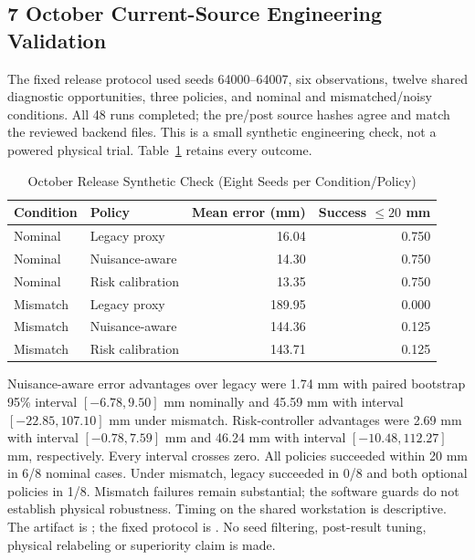 \subsection{7 October Current-Source Engineering Validation}
The fixed release protocol used seeds 64000--64007, six observations, twelve
shared diagnostic opportunities, three policies, and nominal and mismatched/noisy
conditions. All 48 runs completed; the pre/post source hashes agree and match the
reviewed backend files. This is a small synthetic engineering check, not a powered
physical trial. Table~\ref{tab:october-release} retains every outcome.
\begin{table}[t]
\caption{October Release Synthetic Check (Eight Seeds per Condition/Policy)}
\label{tab:october-release}
\centering\scriptsize
\begin{tabular}{@{}llrr@{}}\toprule
Condition & Policy & Mean error (mm) & Success $\leq20$ mm \\
\midrule
Nominal & Legacy proxy & 16.04 & 0.750 \\
Nominal & Nuisance-aware & 14.30 & 0.750 \\
Nominal & Risk calibration & 13.35 & 0.750 \\
Mismatch & Legacy proxy & 189.95 & 0.000 \\
Mismatch & Nuisance-aware & 144.36 & 0.125 \\
Mismatch & Risk calibration & 143.71 & 0.125 \\
\bottomrule\end{tabular}
\end{table}
Nuisance-aware error advantages over legacy were 1.74 mm with paired bootstrap
95\% interval $[-6.78,9.50]$ mm nominally and 45.59 mm with interval
$[-22.85,107.10]$ mm under mismatch. Risk-controller advantages were 2.69 mm
with interval $[-0.78,7.59]$ mm and 46.24 mm with interval $[-10.48,112.27]$ mm,
respectively. Every interval crosses zero. All policies succeeded within 20 mm
in 6/8 nominal cases. Under mismatch, legacy succeeded in 0/8 and both optional
policies in 1/8. Mismatch failures remain substantial; the software guards do not
establish physical robustness. Timing on the shared workstation is descriptive.
The artifact is ; the
fixed protocol is . No seed filtering,
post-result tuning, physical relabeling or superiority claim is made.
